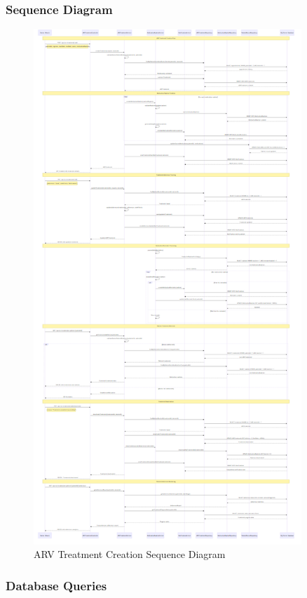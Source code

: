 \documentclass[12pt,a4paper]{article}
\begin{document}
\subsubsection{Sequence Diagram}

\begin{figure}[H]
\centering
\includegraphics[width=0.9\textwidth]{diagrams/arv_treatment_sequence.png}
\caption{ARV Treatment Creation Sequence Diagram}
\label{fig:arv-sequence}
\end{figure}

\subsubsection{Database Queries}
\end{document}
